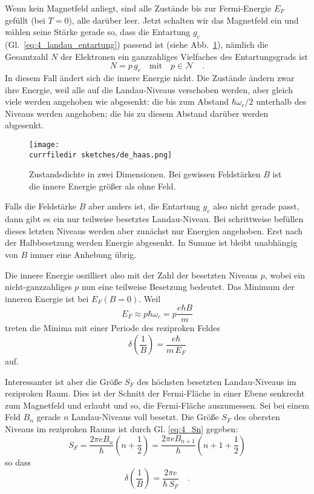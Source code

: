 Wenn kein Magnetfeld anliegt, sind alle Zustände bis zur Fermi-Energie $E_F$ gefüllt (bei $T=0$), alle darüber leer. Jetzt schalten wir das Magnetfeld ein und wählen seine Stärke gerade so, dass die Entartung $g_e$ (Gl.~\ref{eq:4_landau_entartung}) passend ist (siehe Abb.~\ref{fig:4_de_haas}), nämlich  die Gesamtzahl $N$ der Elektronen ein ganzzahliges Vielfaches des Entartungsgrads ist
\begin{equation}
   N = p \, g_e \quad \text{mit} \quad p \in \mathcal{N} \quad .
\end{equation}
In diesem Fall ändert sich die innere Energie nicht. Die Zustände ändern zwar ihre Energie, weil alle auf die Landau-Niveaus verschoben  werden, aber gleich viele werden angehoben wie abgesenkt: die bis zum Abstand $\hbar \omega_c/2$ unterhalb des Niveaus werden angehoben; die bis zu diesem Abstand darüber werden abgesenkt.

\begin{figure}
   \texttt{[image: \\currfiledir sketches/de\_haas.png]}
   \caption{Zustandsdichte in zwei Dimensionen. Bei gewissen Feldstärken $B$ ist die innere Energie größer als ohne Feld. \label{fig:4_de_haas} }
\end{figure}

Falls die Feldstärke $B$ aber anders ist, die Entartung $g_e$ also nicht gerade passt, dann gibt es  ein nur teilweise besetztes Landau-Niveau. Bei schrittweise befüllen dieses letzten Niveaus werden aber zunächst nur Energien angehoben. Erst nach der Halbbesetzung werden Energie abgesenkt. In Summe ist bleibt unabhängig von $B$ immer eine Anhebung übrig.

Die innere Energie oszilliert also mit der Zahl der besetzten Niveaus $p$, wobei ein nicht-ganzzahliges $p$ nun eine teilweise Besetzung bedeutet. Das Minimum der inneren Energie ist bei $E_F(B=0)$.
Weil
\begin{equation}
   E_F \approx p \hbar \omega_c = p \frac{e \hbar B}{m} 
\end{equation}
treten die Minima mit einer Periode des reziproken Feldes   
\begin{equation}
   \delta \left(\frac{1}{B}  \right) = \frac{e \hbar }{m \, E_F}
\end{equation}
auf.

Interessanter ist aber die Größe $S_F$ des höchsten besetzten Landau-Niveaus im reziproken Raum. Dies ist der Schnitt der Fermi-Fläche in  einer Ebene senkrecht zum Magnetfeld und erlaubt und so, die Fermi-Fläche auszumessen. Sei bei einem Feld $B_n$ gerade $n$ Landau-Niveaus voll besetzt. Die Größe $S_F$ des obersten Niveaus im reziproken Raums ist durch Gl. \ref{eq:4_Sn} gegeben:
\begin{equation}
   S_F =  \frac{2 \pi e B_n}{\hbar} \left( n + \frac{1}{2}\right)  = \frac{2 \pi e B_{n+1}}{\hbar} \left( n + 1+ \frac{1}{2}\right)  
\end{equation}
so dass
\begin{equation}
   \delta \left(\frac{1}{B}  \right) = \frac{2 \pi e }{\hbar \, S_F} \quad .
\end{equation}

